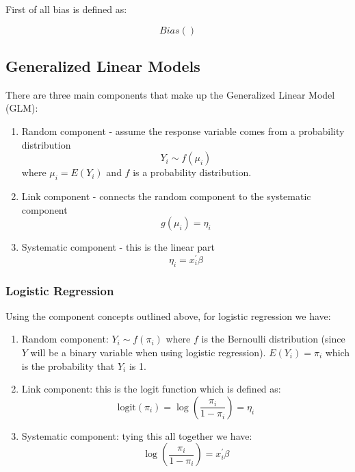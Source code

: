 \documentclass[paper=a4, fontsize=11pt]{scrartcl} %
\numberwithin{equation}{section} %
\numberwithin{figure}{section} %
\numberwithin{table}{section} %
\begin{document}
First of all bias is defined as:

\begin{equation}
Bias()
\end{equation}


\subsection{Generalized Linear Models}

There are three main components that make up the Generalized Linear Model (GLM):

\begin{enumerate}
\item Random component - assume the response variable comes from a probability distribution
\begin{equation}
Y_i \sim f(\mu_i)
\end{equation}
where $\mu_i = E(Y_i)$ and $f$ is a probability distribution.
\item Link component - connects the random component to the systematic component
\begin{equation}
g(\mu_i)=\eta_i
\end{equation}
\item Systematic component - this is the linear part
\begin{equation}
\eta_i = x_i^\prime \beta
\end{equation}

\end{enumerate}


\subsubsection{Logistic Regression}

Using the component concepts outlined above, for logistic regression we have:

\begin{enumerate}
\item Random component: $Y_i \sim f(\pi_i)$ where $f$ is the Bernoulli distribution (since $Y$ will be a binary variable when using logistic regression). $E(Y_i) = \pi_i $ which is the probability that $Y_i$ is 1.
\item Link component: this is the logit function which is defined as:
\begin{equation}
\text{logit}(\pi_i) = \log \left(\frac{\pi_i}{1-\pi_i} \right) = \eta_i
\end{equation}
\item Systematic component: tying this all together we have:
\begin{equation}
\log \left(\frac{\pi_i}{1-\pi_i}\right) = x_i^\prime \beta
\end{equation}
\end{enumerate}
\end{document}
